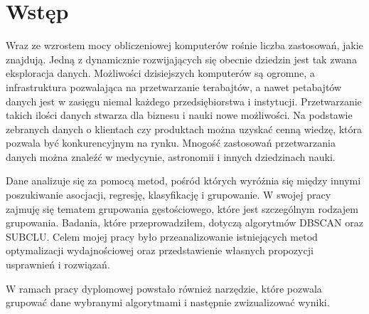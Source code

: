 \chapter{Wstęp}
Wraz ze wzrostem mocy obliczeniowej komputerów rośnie liczba zastosowań, jakie znajdują. Jedną z dynamicznie rozwijających się obecnie dziedzin jest tak zwana eksploracja danych. Możliwości dzisiejszych komputerów są ogromne, a infrastruktura pozwalająca na przetwarzanie terabajtów, a nawet petabajtów danych jest w zasięgu niemal każdego przedsiębiorstwa i instytucji. Przetwarzanie takich ilości danych stwarza dla biznesu i nauki nowe możliwości. Na podstawie zebranych danych o klientach czy produktach można uzyskać cenną wiedzę, która pozwala być konkurencyjnym na rynku. Mnogość zastosowań przetwarzania danych można znaleźć w medycynie, astronomii i innych dziedzinach nauki. \par
Dane analizuje się za pomocą metod, pośród których wyróżnia się między innymi poszukiwanie asocjacji, regresję, klasyfikację i grupowanie. W swojej pracy zajmuję się tematem grupowania gęstościowego, które jest szczególnym rodzajem grupowania. Badania, które przeprowadziłem, dotyczą algorytmów DBSCAN oraz SUBCLU. Celem mojej pracy było przeanalizowanie istniejących metod optymalizacji wydajnościowej oraz przedstawienie własnych propozycji usprawnień i rozwiązań. \par
W ramach pracy dyplomowej powstało również narzędzie, które pozwala grupować dane wybranymi algorytmami i następnie zwizualizować wyniki. 
